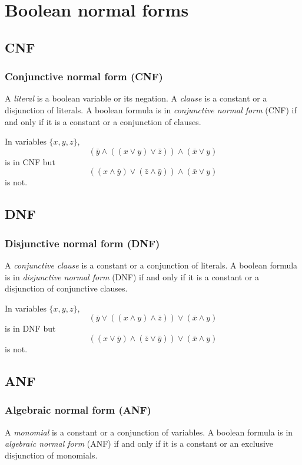 \documentclass{beamer}
\begin{document}
\section[Boolean normal forms]{Boolean normal forms}
\subsection[CNF]{CNF}
\begin{frame}
\frametitle{Conjunctive normal form (CNF)}
A \textit{literal} is a boolean variable or its negation. A \textit{clause} is a constant or a disjunction of literals. A boolean formula is in \textit{conjunctive normal form} (CNF) if and only if it is a constant or a conjunction of clauses. 
\end{frame}

\begin{frame}
\begin{example}
In variables $\{x,y,z\}$,
$$(\bar{y} \land ((x \lor y) \lor \bar{z})) \land (\bar{x} \lor y)$$
is in CNF but 
$$((x \land \bar{y}) \lor (\bar{z} \land \bar{y})) \land (\bar{x} \lor y) $$
is not.
\end{example}
\end{frame}

\subsection[DNF]{DNF}
\begin{frame}
\frametitle{Disjunctive normal form (DNF)}
A \textit{conjunctive clause} is a constant or a conjunction of literals. A boolean formula is in \textit{disjunctive normal form} (DNF) if and only if it is a constant or a disjunction of conjunctive clauses. 
\end{frame}

\begin{frame}
\begin{example}
In variables $\{x,y,z\}$,
$$(\bar{y} \lor ((x \land y) \land \bar{z})) \lor (\bar{x} \land y)$$
is in DNF but 
$$((x \lor \bar{y}) \land (\bar{z} \lor \bar{y})) \lor (\bar{x} \land y) $$
is not.
\end{example}
\end{frame}

\subsection[ANF]{ANF}
\begin{frame}
\frametitle{Algebraic normal form (ANF)}
A \textit{monomial} is a constant or a conjunction of variables. A boolean formula is in \textit{algebraic normal form} (ANF) if and only if it is a constant or an exclusive disjunction of monomials. 
\end{frame}
\end{document}
